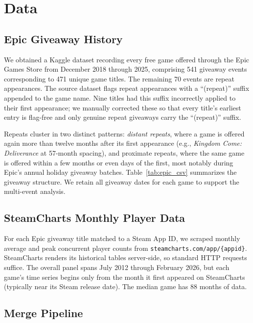 \documentclass[11pt]{article}
\begin{document}
\section{Data}
\label{sec:data}

\subsection{Epic Giveaway History}

We obtained a Kaggle dataset \citep{dongre2025} recording every free game offered through
the Epic Games Store from December 2018 through 2025, comprising 541 giveaway events
corresponding to 471 unique game titles. The remaining 70 events are repeat appearances.
The source dataset flags repeat appearances with a ``(repeat)'' suffix appended to
the game name. Nine titles had this suffix incorrectly applied to their first
appearance; we manually corrected these so that
every title's earliest entry is flag-free and only genuine repeat giveaways carry the
``(repeat)'' suffix.

Repeats cluster in two distinct patterns: \textit{distant repeats}, where a game is
offered again more than twelve months after its first appearance (e.g., \textit{Kingdom
Come: Deliverance} at 57-month spacing), and proximate repeats, where the same
game is offered within a few months or even days of the first, most notably during
Epic's annual holiday giveaway batches.
Table~\ref{tab:epic_csv} summarizes the giveaway structure. We retain all giveaway dates
for each game to support the multi-event analysis.

\subsection{SteamCharts Monthly Player Data}

For each Epic giveaway title matched to a Steam App ID, we scraped monthly average and
peak concurrent player counts from \texttt{steamcharts.com/app/\{appid\}}. SteamCharts
renders its historical tables server-side, so standard HTTP requests suffice.
The overall panel spans July 2012 through February
2026, but each game's time series begins only from the month it first appeared on
SteamCharts (typically near its Steam release date). The median game has 88 months of data.

\subsection{Merge Pipeline}
\end{document}
